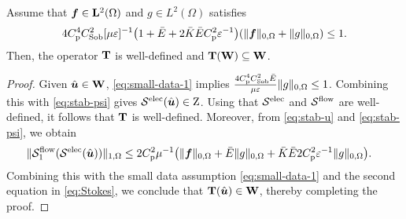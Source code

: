 \begin{lemma}
Assume that $\boldsymbol{f} \in \mathbf{L}^2(\Omega)$ and $g \in L^2(\Omega)$ satisfies
\begin{equation}\label{eq:small-data-1}
4C_{\mathrm{p}}^4 C_{\mathrm{Sob}}^2[\mu\varepsilon]^{-1}\bigl( 1 + \bar{E} + 2\bar{K}\bar{E}C_{\mathrm{p}}^2 {\varepsilon}^{-1}  \bigr)(\|\boldsymbol{f}\|_{0,\Omega} + \|g\|_{0,\Omega}) \leq 1.
\end{equation}
Then, the  operator $\mathbf{T}$ is well-defined and $\mathbf{T}(\mathbf{W})\subseteq \mathbf{W}$.
\end{lemma}
\begin{proof}
Given $\hat{\boldsymbol{u}}\in\mathbf{W}$,  \eqref{eq:small-data-1} implies  $\frac{4C_{\mathrm{p}}^4 C_{\mathrm{Sob}}^2 \bar{E}}{\mu \varepsilon} \|g\|_{0,\Omega}\leq 1$. Combining this with \eqref{eq:stab-psi} gives $\mathcal{S}^{\mathrm{elec}}(\hat{\boldsymbol{u}}) \in \mathrm{Z}$. Using that $\mathcal{S}^{\mathrm{elec}}$ and $\mathcal{S}^{\mathrm{flow}}$ are well-defined, it follows that $\mathbf{T}$ is well-defined. Moreover, from \eqref{eq:stab-u} and \eqref{eq:stab-psi}, we obtain
\begin{align*}
\|\mathcal{S}^{\mathrm{flow}}_1(\mathcal{S}^{\mathrm{elec}}(\hat{\boldsymbol{u}}))\|_{1,\Omega}
&\leq 2 C_{\mathrm{p}}^2\mu^{-1} \bigl( \|\boldsymbol{f}\|_{0,\Omega} + \bar{E}\| g\|_{0,\Omega} + \bar{K}\bar{E}{2C_{\mathrm{p}}^2}{\varepsilon}^{-1}\|g\|_{0,\Omega}\bigr).
\end{align*}
Combining this with the small data assumption \eqref{eq:small-data-1} and the second equation in \eqref{eq:Stokes}, we conclude that $\mathbf{T}(\hat{\boldsymbol{u}})\in\mathbf{W}$, thereby completing the proof.
\end{proof}

